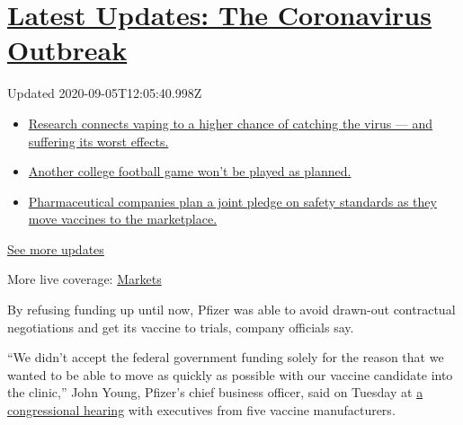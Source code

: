 \hypertarget{latest-updates-the-coronavirus-outbreak}{%
\section{\texorpdfstring{\href{https://www.nytimes3xbfgragh.onion/2020/09/04/world/covid-19-coronavirus.html?action=click\&pgtype=Article\&state=default\&region=MAIN_CONTENT_1\&context=storylines_live_updates}{Latest
Updates: The Coronavirus
Outbreak}}{Latest Updates: The Coronavirus Outbreak}}\label{latest-updates-the-coronavirus-outbreak}}

Updated 2020-09-05T12:05:40.998Z

\begin{itemize}
\tightlist
\item
  \href{https://www.nytimes3xbfgragh.onion/2020/09/04/world/covid-19-coronavirus.html?action=click\&pgtype=Article\&state=default\&region=MAIN_CONTENT_1\&context=storylines_live_updates\#link-1654f6ad}{Research
  connects vaping to a higher chance of catching the virus --- and
  suffering its worst effects.}
\item
  \href{https://www.nytimes3xbfgragh.onion/2020/09/04/world/covid-19-coronavirus.html?action=click\&pgtype=Article\&state=default\&region=MAIN_CONTENT_1\&context=storylines_live_updates\#link-52e4198a}{Another
  college football game won't be played as planned.}
\item
  \href{https://www.nytimes3xbfgragh.onion/2020/09/04/world/covid-19-coronavirus.html?action=click\&pgtype=Article\&state=default\&region=MAIN_CONTENT_1\&context=storylines_live_updates\#link-181cef0}{Pharmaceutical
  companies plan a joint pledge on safety standards as they move
  vaccines to the marketplace.}
\end{itemize}

\href{https://www.nytimes3xbfgragh.onion/2020/09/04/world/covid-19-coronavirus.html?action=click\&pgtype=Article\&state=default\&region=MAIN_CONTENT_1\&context=storylines_live_updates}{See
more updates}

More live coverage:
\href{https://www.nytimes3xbfgragh.onion/live/2020/09/04/business/stock-market-today-coronavirus?action=click\&pgtype=Article\&state=default\&region=MAIN_CONTENT_1\&context=storylines_live_updates}{Markets}

By refusing funding up until now, Pfizer was able to avoid drawn-out
contractual negotiations and get its vaccine to trials, company
officials say.

``We didn't accept the federal government funding solely for the reason
that we wanted to be able to move as quickly as possible with our
vaccine candidate into the clinic,'' John Young, Pfizer's chief business
officer, said on Tuesday at
\href{https://www.nytimes3xbfgragh.onion/2020/07/21/health/covid-19-vaccine-coronavirus-moderna-pfizer.html}{a
congressional hearing} with executives from five vaccine manufacturers.

